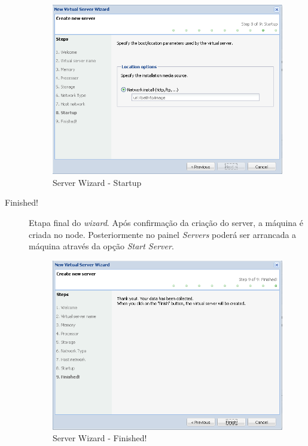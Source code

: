 \begin{description}
		\begin{figure}[H]
			\begin{center}
			\includegraphics[scale=0.5]{screenshots/server_createwiz_startup.png}
			\caption{Server Wizard - Startup}
			\label{fig:server_createwiz_startup}
			\end{center}
		\end{figure}

	\item[Finished!] Etapa final do \emph{wizard}. Após confirmação da criação do server, a máquina é criada no node. Posteriormente no painel \emph{Servers} poderá ser arrancada a máquina através da opção \emph{Start Server}.
		\begin{figure}[H]
			\begin{center}
			\includegraphics[scale=0.5]{screenshots/server_createwiz_finish.png}
			\caption{Server Wizard - Finished!}
			\label{fig:server_createwiz_finish}
			\end{center}
		\end{figure}

\end{description}

